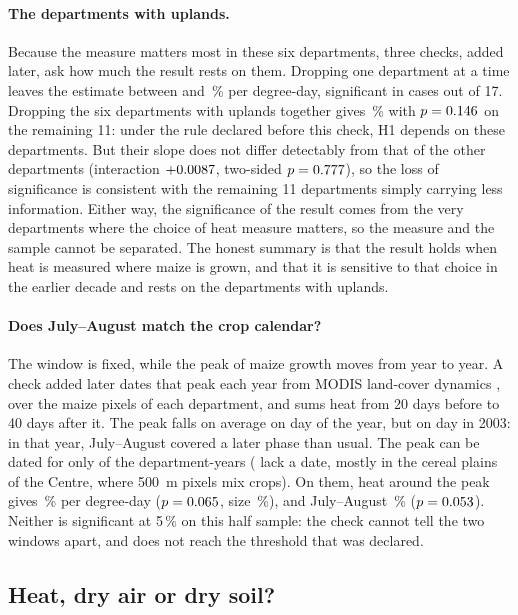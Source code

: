 \paragraph{The departments with uplands.} Because the measure matters most in these six departments, three checks, added later, ask how much the result rests on them. Dropping one department at a time leaves the estimate between \LooMinPct{} and \LooMaxPct\,\% per degree-day, significant in \LooSig{} cases out of 17. Dropping the six departments with uplands together gives \NoReliefPct\,\% with $p = 0.146$ on the remaining 11: under the rule declared before this check, H1 depends on these departments. But their slope does not differ detectably from that of the other departments (interaction $+0.0087$, two-sided $p = 0.777$), so the loss of significance is consistent with the remaining 11 departments simply carrying less information. Either way, the significance of the result comes from the very departments where the choice of heat measure matters, so the measure and the sample cannot be separated. The honest summary is that the result holds when heat is measured where maize is grown, and that it is sensitive to that choice in the earlier decade and rests on the departments with uplands.

\paragraph{Does July--August match the crop calendar?} The window is fixed, while the peak of maize growth moves from year to year. A check added later dates that peak each year from MODIS land-cover dynamics \parencite{friedl2022}, over the maize pixels of each department, and sums heat from 20 days before to 40 days after it. The peak falls on average on day \PhenoPeakMean{} of the year, but on day \PhenoPeakTwoThousandThree{} in 2003: in that year, July--August covered a later phase than usual. The peak can be dated for only \PhenoN{} of the department-years (\PhenoDropped{} lack a date, mostly in the cereal plains of the Centre, where 500~m pixels mix crops). On them, heat around the peak gives \PhenoPct\,\% per degree-day ($p = 0.065$, size \PhenoSize\,\%), and July--August \PhenoJaPct\,\% ($p = 0.053$). Neither is significant at 5\,\% on this half sample: the check cannot tell the two windows apart, and does not reach the threshold that was declared.

\subsection{Heat, dry air or dry soil?}
\label{subsec:maize-vpd}

